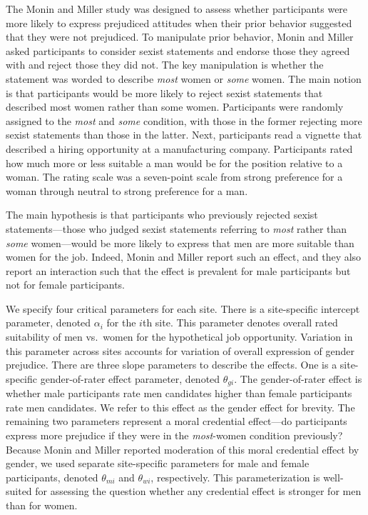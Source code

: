 \documentclass[english,man]{apa6}
\theoremstyle{definition}
\theoremstyle{definition}
\theoremstyle{definition}
\theoremstyle{remark}
\begin{document}
The Monin and Miller study was designed to assess whether participants
were more likely to express prejudiced attitudes when their prior
behavior suggested that they were not prejudiced. To manipulate prior
behavior, Monin and Miller asked participants to consider sexist
statements and endorse those they agreed with and reject those they did
not. The key manipulation is whether the statement was worded to
describe \emph{most} women or \emph{some} women. The main notion is that
participants would be more likely to reject sexist statements that
described most women rather than some women. Participants were randomly
assigned to the \emph{most} and \emph{some} condition, with those in the
former rejecting more sexist statements than those in the latter. Next,
participants read a vignette that described a hiring opportunity at a
manufacturing company. Participants rated how much more or less suitable
a man would be for the position relative to a woman. The rating scale
was a seven-point scale from strong preference for a woman through
neutral to strong preference for a man.

The main hypothesis is that participants who previously rejected sexist
statements---those who judged sexist statements referring to \emph{most}
rather than \emph{some} women---would be more likely to express that men
are more suitable than women for the job. Indeed, Monin and Miller
report such an effect, and they also report an interaction such that the
effect is prevalent for male participants but not for female
participants.

We specify four critical parameters for each site. There is a
site-specific intercept parameter, denoted \(\alpha_i\) for the \(i\)th
site. This parameter denotes overall rated suitability of men vs.~women
for the hypothetical job opportunity. Variation in this parameter across
sites accounts for variation of overall expression of gender prejudice.
There are three slope parameters to describe the effects. One is a
site-specific gender-of-rater effect parameter, denoted \(\theta_{gi}\).
The gender-of-rater effect is whether male participants rate men
candidates higher than female participants rate men candidates. We refer
to this effect as the gender effect for brevity. The remaining two
parameters represent a moral credential effect---do participants express
more prejudice if they were in the \emph{most}-women condition
previously? Because Monin and Miller reported moderation of this moral
credential effect by gender, we used separate site-specific parameters
for male and female participants, denoted \(\theta_{mi}\) and
\(\theta_{wi}\), respectively. This parameterization is well-suited for
assessing the question whether any credential effect is stronger for men
than for women.
\end{document}
